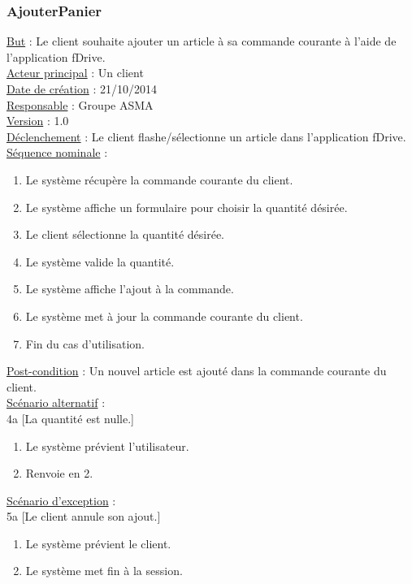 \subsubsection{AjouterPanier}
	\underline{But} : Le client souhaite ajouter un article à sa commande courante à l'aide de l'application fDrive.\\
	\underline{Acteur principal} : Un client\\
	\underline{Date de création} : 21/10/2014\\
	\underline{Responsable} : Groupe ASMA\\
	\underline{Version} : 1.0\\
	\underline{Déclenchement} : Le client flashe/sélectionne un article dans l'application fDrive.\\
	\underline{Séquence nominale} :
		\begin{enumerate}
			\item Le système récupère la commande courante du client.
			\item Le système affiche un formulaire pour choisir la quantité désirée.
			\item Le client sélectionne la quantité désirée.
			\item Le système valide la quantité.
			\item Le système affiche l'ajout à la commande.
			\item Le système met à jour la commande courante du client.
			\item Fin du cas d'utilisation.
		\end{enumerate}
	\underline{Post-condition} : Un nouvel article est ajouté dans la commande courante du client.\\
	\underline{Scénario alternatif} :\\
		4a [La quantité est nulle.]
			\begin{enumerate}[label=4a.\arabic* ]
				\item Le système prévient l'utilisateur.
				\item Renvoie en 2.
			\end{enumerate}
	\underline{Scénario d'exception} :\\
		5a [Le client annule son ajout.]
			\begin{enumerate}[label=5a.\arabic* ]
				\item Le système prévient le client.
				\item Le système met fin à la session.
			\end{enumerate}